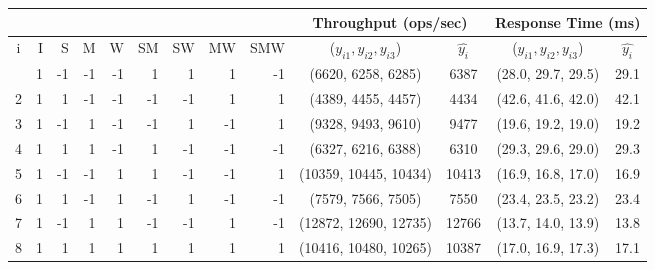 \begin{tabular}{|c|rrrrrrrr|c|c|c|c|}
       \cline{10-13}
       \multicolumn{9}{c}{} & \multicolumn{2}{|c}{\textbf{Throughput} (ops/sec)} & \multicolumn{2}{|c|}{\textbf{Response Time} (ms)}\TBstrut\\
       \hline
       i & \hphantom{-}I\hphantom{-} & \hphantom{-}S\hphantom{-} & \hphantom{-}M\hphantom{-} &\hphantom{-}W\hphantom{-} & SM & SW & MW & SMW & ($y_{i1}, y_{i2}, y_{i3}$) & $\hat{y_i}$  & ($y_{i1}, y_{i2}, y_{i3}$) & $\hat{y_i}$\TBstrut\\
       \hline
   \Tstrut 1 & 1\hphantom{-} & -1\hphantom{-} & -1\hphantom{-} & -1\hphantom{--} & 1\hphantom{--} & 1\hphantom{--} & 1\hphantom{--} & -1\hphantom{---} & (6620, 6258, 6285) & 6387 & (28.0, 29.7, 29.5) & 29.1 \\
   2 & 1\hphantom{-} & 1\hphantom{-} & -1\hphantom{-} & -1\hphantom{--} & -1\hphantom{--} & -1\hphantom{--} & 1\hphantom{--} & 1\hphantom{---} & (4389, 4455, 4457) & 4434 & (42.6, 41.6, 42.0) & 42.1 \\
   3 & 1\hphantom{-} & -1\hphantom{-} & 1\hphantom{-} & -1\hphantom{--} & -1\hphantom{--} & 1\hphantom{--} & -1\hphantom{--} & 1\hphantom{---} & (9328, 9493, 9610) & 9477 & (19.6, 19.2, 19.0) & 19.2 \\
   4 & 1\hphantom{-} & 1\hphantom{-} & 1\hphantom{-} & -1\hphantom{--} & 1\hphantom{--} & -1\hphantom{--} & -1\hphantom{--} & -1\hphantom{---} & (6327, 6216, 6388) & 6310 & (29.3, 29.6, 29.0) & 29.3 \\
   5 & 1\hphantom{-} & -1\hphantom{-} & -1\hphantom{-} & 1\hphantom{--} & 1\hphantom{--} & -1\hphantom{--} & -1\hphantom{--} & 1\hphantom{---} & (10359, 10445, 10434) & 10413 & (16.9, 16.8, 17.0) & 16.9 \\
   6 & 1\hphantom{-} & 1\hphantom{-} & -1\hphantom{-} & 1\hphantom{--} & -1\hphantom{--} & 1\hphantom{--} & -1\hphantom{--} & -1\hphantom{---} & (7579, 7566, 7505) & 7550 & (23.4, 23.5, 23.2) & 23.4 \\
   7 & 1\hphantom{-} & -1\hphantom{-} & 1\hphantom{-} & 1\hphantom{--} & -1\hphantom{--} & -1\hphantom{--} & 1\hphantom{--} & -1\hphantom{---} & (12872, 12690, 12735) & 12766 & (13.7, 14.0, 13.9) & 13.8 \\
   8 & 1\hphantom{-} & 1\hphantom{-} & 1\hphantom{-} & 1\hphantom{--} & 1\hphantom{--} & 1\hphantom{--} & 1\hphantom{--} & 1\hphantom{---} & (10416, 10480, 10265) & 10387 & (17.0, 16.9, 17.3) & 17.1 \\
   \hline
    \end{tabular}